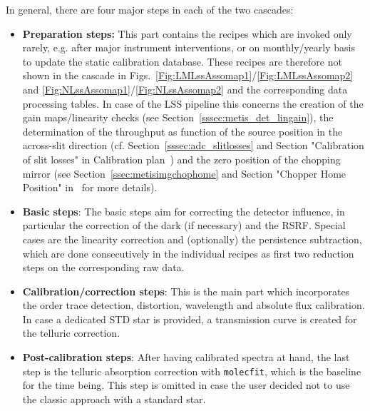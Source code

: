 In general, there are four major steps in each of the two cascades:
\begin{itemize}
    \item \textbf{Preparation steps:} This part contains the recipes which are invoked only rarely, e.g. after major instrument interventions, or on monthly/yearly basis to update the static calibration database. These recipes are therefore not shown in the cascade in Figs.~\ref{Fig:LMLssAssomap1}/\ref{Fig:LMLssAssomap2} and \ref{Fig:NLssAssomap1}/\ref{Fig:NLssAssomap2} and the corresponding data processing tables. In case of the \ac{LSS} pipeline this concerns the creation of the gain maps/linearity checks (see Section~\ref{sssec:metis_det_lingain}), the determination of the throughput as function of the source position in the across-slit direction (cf. Section~\ref{sssec:adc_slitlosses} and Section "Calibration of slit losses" in Calibration plan~\cite{METIS-calibration_plan}) and the zero position of the chopping mirror (see Section~\ref{ssec:metisimgchophome} and Section "Chopper Home Position" in~\cite{METIS-calibration_plan} for more details). 
    \item \textbf{Basic steps}: The basic steps aim for correcting the detector influence, in particular the correction of the dark (if necessary) and the \ac{RSRF}. Special cases are the linearity correction and (optionally) the persistence subtraction, which are done consecutively in the individual recipes as first two reduction steps on the corresponding raw data. %
    \item \textbf{Calibration/correction steps}: This is the main part which incorporates the order trace detection, distortion, wavelength and absolute flux calibration. In case a dedicated \ac{STD} star is provided, a transmission curve is created for the telluric correction.
    \item \textbf{Post-calibration steps}: After having calibrated spectra at hand, the last step is the telluric absorption correction with \texttt{molecfit}, which is the baseline for the time being. This step is omitted in case the user decided not to use the classic approach with a standard star.
\end{itemize}

